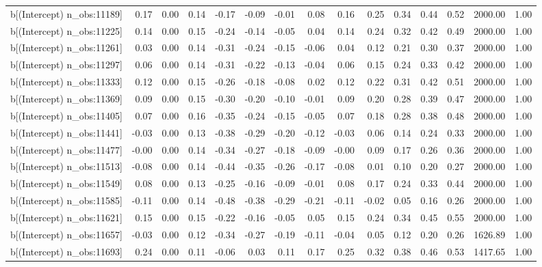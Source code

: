 \begin{table}[ht]
\begin{tabular}{rrrrrrrrrrrrrrr}
  b[(Intercept) n\_obs:11189] & 0.17 & 0.00 & 0.14 & -0.17 & -0.09 & -0.01 & 0.08 & 0.16 & 0.25 & 0.34 & 0.44 & 0.52 & 2000.00 & 1.00 \\ 
  b[(Intercept) n\_obs:11225] & 0.14 & 0.00 & 0.15 & -0.24 & -0.14 & -0.05 & 0.04 & 0.14 & 0.24 & 0.32 & 0.42 & 0.49 & 2000.00 & 1.00 \\ 
  b[(Intercept) n\_obs:11261] & 0.03 & 0.00 & 0.14 & -0.31 & -0.24 & -0.15 & -0.06 & 0.04 & 0.12 & 0.21 & 0.30 & 0.37 & 2000.00 & 1.00 \\ 
  b[(Intercept) n\_obs:11297] & 0.06 & 0.00 & 0.14 & -0.31 & -0.22 & -0.13 & -0.04 & 0.06 & 0.15 & 0.24 & 0.33 & 0.42 & 2000.00 & 1.00 \\ 
  b[(Intercept) n\_obs:11333] & 0.12 & 0.00 & 0.15 & -0.26 & -0.18 & -0.08 & 0.02 & 0.12 & 0.22 & 0.31 & 0.42 & 0.51 & 2000.00 & 1.00 \\ 
  b[(Intercept) n\_obs:11369] & 0.09 & 0.00 & 0.15 & -0.30 & -0.20 & -0.10 & -0.01 & 0.09 & 0.20 & 0.28 & 0.39 & 0.47 & 2000.00 & 1.00 \\ 
  b[(Intercept) n\_obs:11405] & 0.07 & 0.00 & 0.16 & -0.35 & -0.24 & -0.15 & -0.05 & 0.07 & 0.18 & 0.28 & 0.38 & 0.48 & 2000.00 & 1.00 \\ 
  b[(Intercept) n\_obs:11441] & -0.03 & 0.00 & 0.13 & -0.38 & -0.29 & -0.20 & -0.12 & -0.03 & 0.06 & 0.14 & 0.24 & 0.33 & 2000.00 & 1.00 \\ 
  b[(Intercept) n\_obs:11477] & -0.00 & 0.00 & 0.14 & -0.34 & -0.27 & -0.18 & -0.09 & -0.00 & 0.09 & 0.17 & 0.26 & 0.36 & 2000.00 & 1.00 \\ 
  b[(Intercept) n\_obs:11513] & -0.08 & 0.00 & 0.14 & -0.44 & -0.35 & -0.26 & -0.17 & -0.08 & 0.01 & 0.10 & 0.20 & 0.27 & 2000.00 & 1.00 \\ 
  b[(Intercept) n\_obs:11549] & 0.08 & 0.00 & 0.13 & -0.25 & -0.16 & -0.09 & -0.01 & 0.08 & 0.17 & 0.24 & 0.33 & 0.44 & 2000.00 & 1.00 \\ 
  b[(Intercept) n\_obs:11585] & -0.11 & 0.00 & 0.14 & -0.48 & -0.38 & -0.29 & -0.21 & -0.11 & -0.02 & 0.05 & 0.16 & 0.26 & 2000.00 & 1.00 \\ 
  b[(Intercept) n\_obs:11621] & 0.15 & 0.00 & 0.15 & -0.22 & -0.16 & -0.05 & 0.05 & 0.15 & 0.24 & 0.34 & 0.45 & 0.55 & 2000.00 & 1.00 \\ 
  b[(Intercept) n\_obs:11657] & -0.03 & 0.00 & 0.12 & -0.34 & -0.27 & -0.19 & -0.11 & -0.04 & 0.05 & 0.12 & 0.20 & 0.26 & 1626.89 & 1.00 \\ 
  b[(Intercept) n\_obs:11693] & 0.24 & 0.00 & 0.11 & -0.06 & 0.03 & 0.11 & 0.17 & 0.25 & 0.32 & 0.38 & 0.46 & 0.53 & 1417.65 & 1.00 \\ 

\end{tabular}
\end{table}
